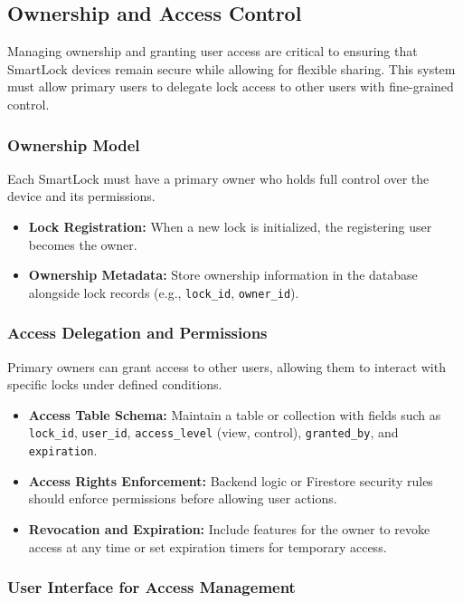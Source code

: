 \newpage
\subsection{Ownership and Access Control}

Managing ownership and granting user access are critical to ensuring that SmartLock devices remain secure while allowing for flexible sharing. This system must allow primary users to delegate lock access to other users with fine-grained control.

\subsubsection{Ownership Model}

Each SmartLock must have a primary owner who holds full control over the device and its permissions.

\begin{itemize}
  \item \textbf{Lock Registration:} When a new lock is initialized, the registering user becomes the owner.
  \item \textbf{Ownership Metadata:} Store ownership information in the database alongside lock records (e.g., \texttt{lock\_id}, \texttt{owner\_id}).
\end{itemize}

\subsubsection{Access Delegation and Permissions}

Primary owners can grant access to other users, allowing them to interact with specific locks under defined conditions.

\begin{itemize}
  \item \textbf{Access Table Schema:} Maintain a table or collection with fields such as \texttt{lock\_id}, \texttt{user\_id}, \texttt{access\_level} (view, control), \texttt{granted\_by}, and \texttt{expiration}.
  \item \textbf{Access Rights Enforcement:} Backend logic or Firestore security rules should enforce permissions before allowing user actions.
  \item \textbf{Revocation and Expiration:} Include features for the owner to revoke access at any time or set expiration timers for temporary access.
\end{itemize}

\subsubsection{User Interface for Access Management}

